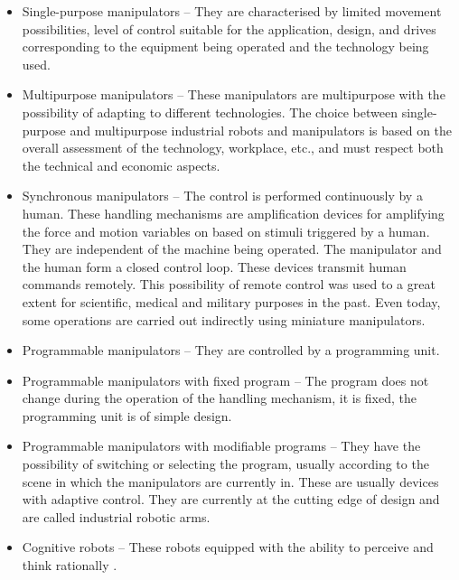 \begin{itemize}

    \item  Single-purpose manipulators -- They are characterised by limited movement possibilities, level of control suitable for the application, design, and drives corresponding to the equipment being operated and the technology being used.

    \item Multipurpose manipulators -- These manipulators are multipurpose with the possibility of adapting to different technologies. The choice between single-purpose and multipurpose industrial robots and manipulators is based on the overall assessment of the technology, workplace, etc., and must respect both the technical and economic aspects.

    \item  Synchronous manipulators -- The control is performed continuously by a human. These handling mechanisms are amplification devices for amplifying the force and motion variables on based on stimuli triggered by a human. They are independent of the machine being operated. The manipulator and the human form a closed control loop. These devices transmit human commands remotely. This possibility of remote control was used to a great extent for scientific, medical and military purposes in the past. Even today, some operations are carried out indirectly using miniature manipulators. 

    \item  Programmable manipulators -- They are controlled by a programming unit.

    \item  Programmable manipulators with fixed program -- The program does not change during the operation of the handling mechanism, it is fixed, the programming unit is of simple design.

    \item  Programmable manipulators with modifiable programs -- They have the possibility of switching or selecting the program, usually according to the scene in which the manipulators are currently in. These are usually devices with adaptive control. They are currently at the cutting edge of design and are called industrial robotic arms.

    \item  Cognitive robots -- These robots equipped with the ability to perceive and think rationally \cite{vsb_2007}.

\end{itemize}

